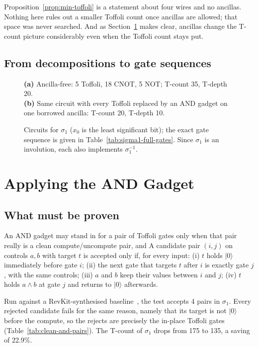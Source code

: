 \documentclass[runningheads,10pt]{llncs}
\begin{document}
\begin{remark}[scope]
Proposition~\ref{prop:min-toffoli} is a statement about four wires and no ancillas. Nothing here rules out a smaller Toffoli count once ancillas are allowed; that space was never searched. And as Section~\ref{sec:and-gadget-applied} makes clear, ancillas change the T-count picture considerably even when the Toffoli count stays put.
\end{remark}

\subsection{From decompositions to gate sequences}


\begin{figure}[htbp]
\centering
\textbf{(a)} Ancilla-free: 5 Toffoli, 18 CNOT, 5 NOT; T-count 35, T-depth 20.\\[4pt]
\textbf{(b)} Same circuit with every Toffoli replaced by an AND gadget on one borrowed ancilla: T-count 20, T-depth 10.
\caption{Circuits for $\sigma_1$ ($x_0$ is the least significant bit); the exact gate sequence is given in Table~\ref{tab:sigma1-full-gates}. Since $\sigma_1$ is an involution, each also implements $\sigma_1^{-1}$.}
\label{fig:sigma1-full}
\end{figure}

\section{Applying the AND Gadget}
\label{sec:and-gadget-applied}

\subsection{What must be proven}

An AND gadget may stand in for a pair of Toffoli gates only when that pair really is a clean compute/uncompute pair, and  A candidate pair $(i,j)$ on controls $a,b$ with target $t$ is accepted only if, for every input: (i) $t$ holds $|0\rangle$ immediately before gate $i$; (ii) the next gate that targets $t$ after $i$ is exactly gate $j$, with the same controls; (iii) $a$ and $b$ keep their values between $i$ and $j$; (iv) $t$ holds $a \wedge b$ at gate $j$ and returns to $|0\rangle$ afterwards. 

Run against a RevKit-synthesised baseline~\cite{soeken2012revkit}, the test accepts 4 pairs in $\sigma_1$. Every rejected candidate fails for the same reason, namely that its target is not $|0\rangle$ before the compute, so the rejects are precisely the in-place Toffoli gates (Table~\ref{tab:clean-and-pairs}). The T-count of $\sigma_1$ drops from 175 to 135, a saving of 22.9\%.
\end{document}
